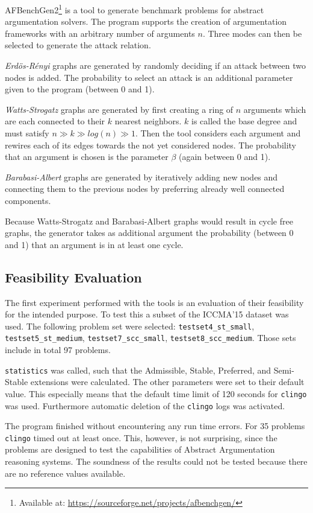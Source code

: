 \documentclass[parskip=half]{scrartcl}
\begin{document}
AFBenchGen2\footnote{Available at:
\url{https://sourceforge.net/projects/afbenchgen/}} is a tool to generate
benchmark problems for abstract argumentation solvers\cite{afbenchgen2}. The
program supports the creation of argumentation frameworks with an arbitrary
number of arguments $n$. Three modes can then be selected to generate the attack
relation.

\emph{Erdös-Rényi} graphs are generated by randomly deciding if an attack
between two nodes is added. The probability to select an attack is an additional
parameter given to the program (between 0 and 1).

\emph{Watts-Strogatz} graphs are generated by first creating a ring of $n$
arguments which are each connected to their $k$ nearest neighbors. $k$ is called
the base degree and must satisfy $n \gg k \gg log(n) \gg 1$. Then the tool
considers each argument and rewires each of its edges towards the not yet
considered nodes. The probability that an argument is chosen is the parameter
$\beta$ (again between 0 and 1).

\emph{Barabasi-Albert} graphs are generated by iteratively adding new nodes and
connecting them to the previous nodes by preferring already well connected
components.

Because Watts-Strogatz and Barabasi-Albert graphs would result in cycle free
graphs, the generator takes as additional argument the probability (between 0
and 1) that an argument is in at least one cycle.

\subsection{Feasibility Evaluation}
The first experiment performed with the tools is an evaluation of their
feasibility for the intended purpose. To test this a subset of the ICCMA'15
dataset was used. The following problem set were selected:
\texttt{testset4\_st\_small}, \texttt{testset5\_st\_medium},
\texttt{testset7\_scc\_small}, \texttt{testset8\_scc\_medium}. Those sets
include in total 97 problems.

\texttt{statistics} was called, such that the Admissible, Stable, Preferred, and
Semi-Stable extensions were calculated. The other parameters were set to their
default value. This especially means that the default time limit of 120 seconds
for \texttt{clingo} was used. Furthermore automatic deletion of the
\texttt{clingo} logs was activated.

The program finished without encountering any run time errors. For 35 problems
\texttt{clingo} timed out at least once. This, however, is not surprising, since
the problems are designed to test the capabilities of Abstract Argumentation
reasoning systems. The soundness of the results could not be tested because
there are no reference values available.
\end{document}
